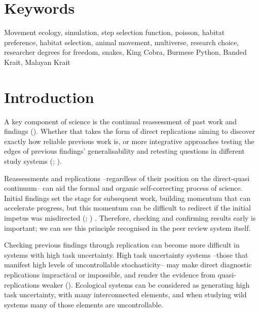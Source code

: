 \documentclass[10pt,a4paper]{article}
\begin{document}
\section*{Keywords}

Movement ecology, simulation, step selection function, poisson, habitat preference, habitat selection, animal movement, multiverse, research choice, researcher degrees for freedom, snakes, King Cobra, Burmese Python, Banded Krait, Malayan Krait

\clearpage
\pagestyle{fancy}

\section{Introduction}\label{introduction}

A key component of science is the continual reassessment of past work and findings ().
Whether that takes the form of direct replications aiming to discover exactly how reliable previous work is, or more integrative approaches testing the edges of previous findings' generalisability and retesting questions in different study systems (; ).

Reassessments and replications --regardless of their position on the direct-quasi continuum-- can aid the formal and organic self-correcting process of science.
Initial findings set the stage for subsequent work, building momentum that can accelerate progress, but this momentum can be difficult to redirect if the initial impetus was misdirected (; ) .
Therefore, checking and confirming results early is important; we can see this principle recognised in the peer review system itself.

Checking previous findings through replication can become more difficult in systems with high task uncertainty.
High task uncertainty systems --those that manifest high levels of uncontrollable stochasticity-- may make direct diagnostic replications impractical or impossible, and render the evidence from quasi-replications weaker ().
Ecological systems can be considered as generating high task uncertainty, with many interconnected elements, and when studying wild systems many of those elements are uncontrollable.
\end{document}
